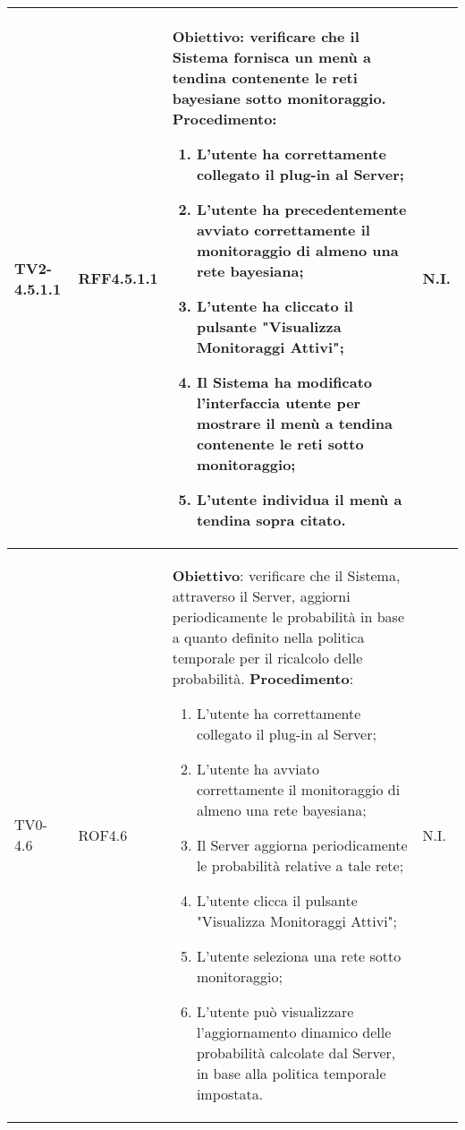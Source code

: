 \begin{longtable}{|C{.15\textwidth}|C{.13\textwidth}|m{.65\textwidth}|C{.08\textwidth}|}
TV2-4.5.1.1 & RFF4.5.1.1 &
	\textbf{Obiettivo}: verificare che il Sistema fornisca un menù a  tendina contenente le reti bayesiane sotto monitoraggio. \newline
	\textbf{Procedimento}:
	\begin{enumerate}
		\item L'utente ha correttamente collegato il plug-in al Server;
		\item L'utente ha precedentemente avviato correttamente il monitoraggio di almeno una rete bayesiana;
		\item L'utente ha cliccato il pulsante "Visualizza Monitoraggi Attivi";
		\item Il Sistema ha modificato l'interfaccia utente per mostrare il menù a tendina contenente le reti sotto monitoraggio;
		\item L'utente individua il menù a tendina sopra citato.
	\end{enumerate}
	& N.I. \\
\hline

TV0-4.6 & ROF4.6 &
	\textbf{Obiettivo}: verificare che il Sistema, attraverso il Server, aggiorni periodicamente le probabilità in base a quanto definito nella politica temporale per il ricalcolo delle probabilità. \newline
	\textbf{Procedimento}:
	\begin{enumerate}
		\item L'utente ha correttamente collegato il plug-in al Server;
		\item L'utente ha avviato correttamente il monitoraggio di almeno una rete bayesiana;
		\item Il Server aggiorna periodicamente le probabilità relative a tale rete;
		\item L'utente clicca il pulsante "Visualizza Monitoraggi Attivi";
		\item L'utente seleziona una rete sotto monitoraggio;
		\item L'utente può visualizzare l'aggiornamento dinamico delle probabilità calcolate dal Server, in base alla politica temporale impostata.
	\end{enumerate}
	& N.I. \\
\hline


\end{longtable}
